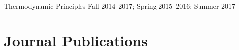 \begin{outerlist}
\item Thermodynamic Principles \hfill Fall 2014--2017; Spring 2015--2016; Summer 2017


\end{outerlist}

\section{{\sectionfont Journal Publications}}

